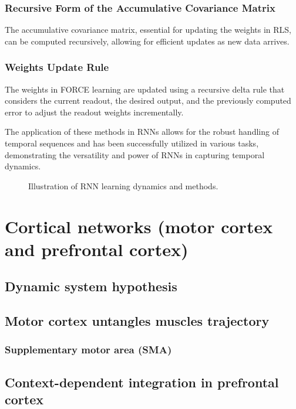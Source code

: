 \documentclass[11pt]{book} %
\begin{document}
\subsubsection{Recursive Form of the Accumulative Covariance Matrix}
The accumulative covariance matrix, essential for updating the weights in RLS, can be computed recursively, allowing for efficient updates as new data arrives.

\subsubsection{Weights Update Rule}
The weights in FORCE learning are updated using a recursive delta rule that considers the current readout, the desired output, and the previously computed error to adjust the readout weights incrementally.

The application of these methods in RNNs allows for the robust handling of temporal sequences and has been successfully utilized in various tasks, demonstrating the versatility and power of RNNs in capturing temporal dynamics.

\begin{figure}[ht]
\centering
\caption{Illustration of RNN learning dynamics and methods.}
\label{fig:rnn_learning}
\end{figure}

%
%
%

\section{Cortical networks (motor cortex and prefrontal cortex)}
\subsection{Dynamic system hypothesis}
\subsection{Motor cortex untangles muscles trajectory}
\subsubsection{Supplementary motor area (SMA)}
\subsection{Context-dependent integration in prefrontal cortex}
\end{document}
